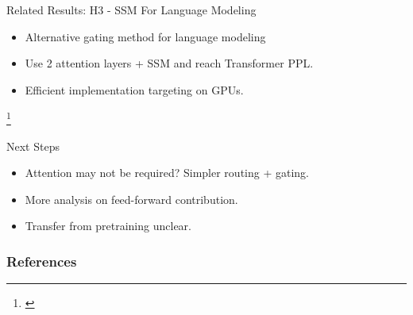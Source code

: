 \documentclass[14pt,aspectratio=169]{beamer}
\newcommand\blfootnote[1]{%
\begingroup
\renewcommand\thefootnote{}\footnote{#1}%
\addtocounter{footnote}{-1}%
\endgroup
}
\begin{document}
\begin{frame}{Related Results: H3 - SSM For Language Modeling}
\begin{itemize}
    \item Alternative gating method for language modeling
    \item Use 2 attention layers + SSM and reach Transformer PPL. 
    \item Efficient implementation targeting on GPUs. 
\end{itemize}

    \blfootnote{\cite{dao2022hungry}}
\end{frame}




\begin{frame}{Next Steps}
\begin{itemize}
    \item Attention may not be required? Simpler routing + gating. 
    \item More analysis on feed-forward contribution. 
    \item Transfer from pretraining unclear.
\end{itemize}
\end{frame}



% 
% 
% 
% 
% 
% 
% 
\begin{frame}[allowframebreaks, label=current]
        \frametitle{References}
        \footnotesize
        
        
        

\end{frame}
\end{document}
